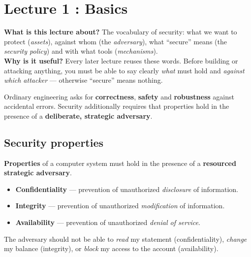 \chapter{Lecture 1 : Basics}

\begin{rembox}[title=In a nutshell]
\textbf{What is this lecture about?} The vocabulary of security: what we want to protect
(\emph{assets}), against whom (the \emph{adversary}), what ``secure'' means (the
\emph{security policy}) and with what tools (\emph{mechanisms}). \\
\textbf{Why is it useful?} Every later lecture reuses these words. Before building or
attacking anything, you must be able to say clearly \emph{what} must hold and
\emph{against which attacker} --- otherwise ``secure'' means nothing.
\end{rembox}

\begin{rembox}[title=Why a course on security?]
Ordinary engineering asks for \textbf{correctness}, \textbf{safety} and
\textbf{robustness} against accidental errors. Security additionally requires that
properties hold in the presence of a \textbf{deliberate, strategic adversary}.
\end{rembox}

\section{Security properties}

\textbf{Properties} of a computer system must hold in the presence of a \textbf{resourced strategic adversary}.

\begin{defnbox}[title=CIA triad]
\begin{itemize}
  \item \textbf{Confidentiality} — prevention of unauthorized \emph{disclosure} of information.
  \item \textbf{Integrity} — prevention of unauthorized \emph{modification} of information.
  \item \textbf{Availability} — prevention of unauthorized \emph{denial of service}.
\end{itemize}
\end{defnbox}

\begin{exbox}[title=CIA on a bank account]
The adversary should not be able to \textit{read} my statement (confidentiality),
\textit{change} my balance (integrity), or \textit{block} my access to the account
(availability).
\end{exbox}

